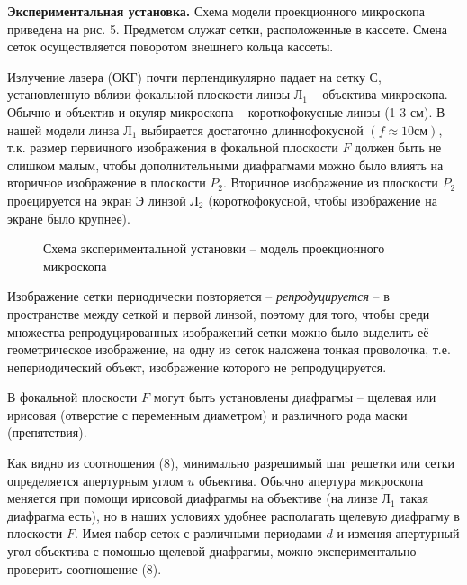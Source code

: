 \documentclass[14pt]{article}
\begin{document}
\textbf{Экспериментальная установка.} Схема модели проекционного микроскопа приведена
на рис. 5. Предметом служат сетки, расположенные в кассете. Смена сеток осуществляется поворотом внешнего
кольца кассеты.

Излучение лазера (ОКГ) почти перпендикулярно падает на сетку С, установленную вблизи фокальной плоскости линзы
Л$_1$ -- объектива микроскопа. Обычно и объектив и окуляр микроскопа -- короткофокусные
линзы (1-3 см). В нашей модели линза Л$_1$ выбирается достаточно длиннофокусной
$(f \approx 10 \text{см})$, т.к. размер первичного изображения в фокальной
плоскости $F$ должен быть не слишком малым, чтобы дополнительными диафрагмами можно было влиять на вторичное изображение
в плоскости $P_2$. Вторичное изображение из плоскости $P_2$ проецируется
на экран Э линзой Л$_2$ (короткофокусной, чтобы изображение на экране
было крупнее).

\begin{figure}[h!]
	\caption{Схема экспериментальной установки -- модель проекционного микроскопа}
	\label{fig:image}
\end{figure}

Изображение сетки периодически повторяется -- \textsl{репродуцируется} --
в пространстве между сеткой и первой линзой, поэтому для того, чтобы среди множества
репродуцированных изображений сетки можно было выделить её геометрическое изображение,
на одну из сеток наложена тонкая проволочка, т.е. непериодический объект, изображение
которого не репродуцируется.

В фокальной плоскости $F$ могут быть установлены диафрагмы -- щелевая
или ирисовая (отверстие с переменным диаметром) и различного рода маски (препятствия).

Как видно из соотношения (8), минимально разрешимый шаг решетки или сетки определяется
апертурным углом $u$ объектива. Обычно апертура микроскопа меняется при помощи ирисовой диафрагмы
на объективе (на линзе Л$_1$ такая диафрагма есть), но в наших условиях удобнее располагать щелевую
диафрагму в плоскости $F$. Имея набор сеток с различными периодами $d$ и изменяя апертурный угол
объектива с помощью щелевой диафрагмы, можно экспериментально проверить соотношение (8).
\end{document}
